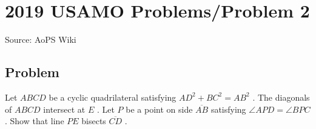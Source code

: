 \documentclass[12pt]{article}
\begin{document}
\section*{{2019 USAMO Problems/Problem 2}}
Source: AoPS Wiki

\subsection*{Problem}
Let $ABCD$ be a cyclic quadrilateral satisfying $AD^2 + BC^2 = AB^2$ . The diagonals of $ABCD$ intersect at $E$ . Let $P$ be a point on side $\overline{AB}$ satisfying $\angle APD = \angle BPC$ . Show that line $PE$ bisects $\overline{CD}$ .
\end{document}
